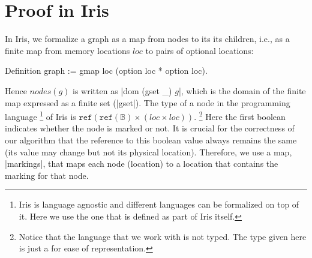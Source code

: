 \documentclass[]{scrartcl}
\newcommand{\nodes}{\mathit{nodes}}
\newcommand{\locT}{\mathit{loc}}
\newcommand{\textlang}[1]{\texttt{#1}}
\newcommand{\Tbool}{\mathbb{B}}
\def\Tref(#1){\textlang{ref}(#1)}
\begin{document}
\section{Proof in Iris}
In Iris, we formalize a graph as a map from nodes to its its children, i.e., as a finite map from memory locations $\mathit{loc}$ to pairs of optional locations:
\begin{Coq}
Definition graph := gmap loc (option loc * option loc).
\end{Coq}
Hence $\nodes(g)$ is written as \Coqe|dom (gset _) $g$|, which is the domain of the finite map expressed as a finite set (\Coqe|gset|).
The type of a node in the programming language%
\footnote{Iris is language agnostic and different languages can be formalized on top of it.
Here we use the one that is defined as part of Iris itself.}
of Iris is $\Tref(\Tref(\Tbool) \times (\locT \times \locT))$.%
\footnote{Notice that the language that we work with is not typed.
The type given here is just a for ease of representation.}
Here the first boolean indicates whether the node is marked or not.
It is crucial for the correctness of our algorithm that the reference to this boolean value
always remains the same (its value may change but not its physical location).
Therefore, we use a map, \Coqe|markings|, that maps each node (location) to a location that contains the marking for that node.
\end{document}
